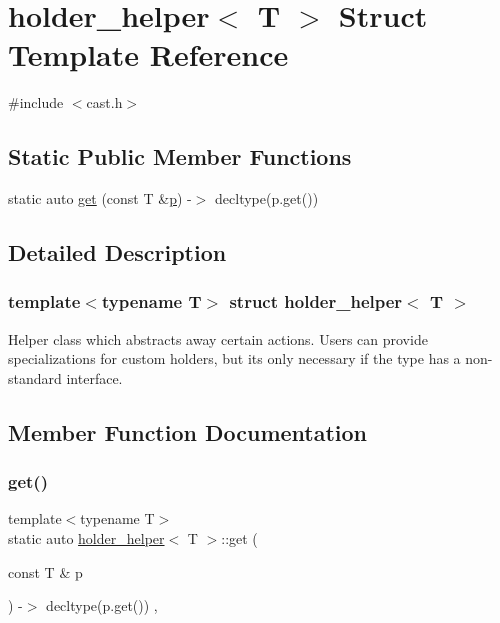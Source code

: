 \hypertarget{structholder__helper}{}\section{holder\+\_\+helper$<$ T $>$ Struct Template Reference}
\label{structholder__helper}


{\ttfamily \#include $<$cast.\+h$>$}

\subsection*{Static Public Member Functions}
\begin{DoxyCompactItemize}
\item 
static auto \mbox{\hyperlink{structholder__helper_ac1b658f0c6832c9e3077a3eb19fdef92}{get}} (const T \&\mbox{\hyperlink{_s_d_l__opengl__glext_8h_aa5367c14d90f462230c2611b81b41d23}{p}}) -\/$>$ decltype(p.\+get())
\end{DoxyCompactItemize}


\subsection{Detailed Description}
\subsubsection*{template$<$typename T$>$\newline
struct holder\+\_\+helper$<$ T $>$}

Helper class which abstracts away certain actions. Users can provide specializations for custom holders, but it\textquotesingle{}s only necessary if the type has a non-\/standard interface. 

\subsection{Member Function Documentation}
\mbox{\label{structholder__helper_ac1b658f0c6832c9e3077a3eb19fdef92}} 
\subsubsection{\texorpdfstring{get()}{get()}}
{\footnotesize\ttfamily template$<$typename T$>$ \\
static auto \mbox{\hyperlink{structholder__helper}{holder\+\_\+helper}}$<$ T $>$\+::get (\begin{DoxyParamCaption}\item[{const T \&}]{p }\end{DoxyParamCaption}) -\/$>$ decltype(p.\+get()) \hspace{0.3cm}{\ttfamily [inline]}, {\ttfamily [static]}}



